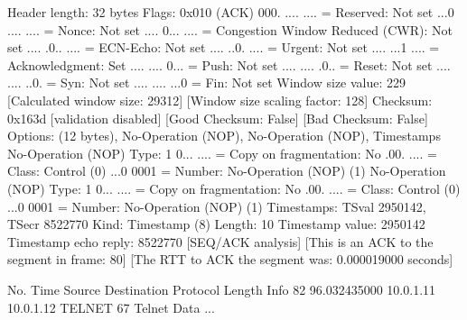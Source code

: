     Header length: 32 bytes
    Flags: 0x010 (ACK)
        000. .... .... = Reserved: Not set
        ...0 .... .... = Nonce: Not set
        .... 0... .... = Congestion Window Reduced (CWR): Not set
        .... .0.. .... = ECN-Echo: Not set
        .... ..0. .... = Urgent: Not set
        .... ...1 .... = Acknowledgment: Set
        .... .... 0... = Push: Not set
        .... .... .0.. = Reset: Not set
        .... .... ..0. = Syn: Not set
        .... .... ...0 = Fin: Not set
    Window size value: 229
    [Calculated window size: 29312]
    [Window size scaling factor: 128]
    Checksum: 0x163d [validation disabled]
        [Good Checksum: False]
        [Bad Checksum: False]
    Options: (12 bytes), No-Operation (NOP), No-Operation (NOP), Timestamps
        No-Operation (NOP)
            Type: 1
                0... .... = Copy on fragmentation: No
                .00. .... = Class: Control (0)
                ...0 0001 = Number: No-Operation (NOP) (1)
        No-Operation (NOP)
            Type: 1
                0... .... = Copy on fragmentation: No
                .00. .... = Class: Control (0)
                ...0 0001 = Number: No-Operation (NOP) (1)
        Timestamps: TSval 2950142, TSecr 8522770
            Kind: Timestamp (8)
            Length: 10
            Timestamp value: 2950142
            Timestamp echo reply: 8522770
    [SEQ/ACK analysis]
        [This is an ACK to the segment in frame: 80]
        [The RTT to ACK the segment was: 0.000019000 seconds]

No.     Time           Source                Destination           Protocol Length Info
     82 96.032435000   10.0.1.11             10.0.1.12             TELNET   67     Telnet Data ...

